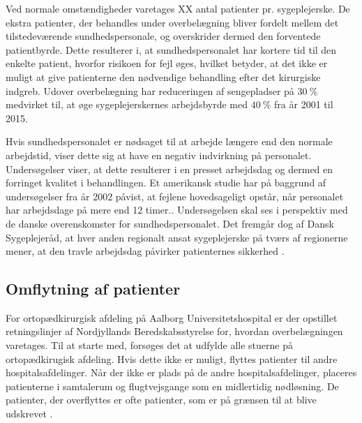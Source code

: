 \noindent 
Ved normale omstændigheder varetages XX antal patienter pr. sygeplejerske. De ekstra patienter, der behandles under overbelægning bliver fordelt mellem det tilstedeværende sundhedspersonale, og overskrider dermed den forventede patientbyrde. 
Dette resulterer i, at sundhedspersonalet har kortere tid til den enkelte patient, hvorfor risikoen for fejl øges, hvilket betyder, at det ikke er muligt at give patienterne den nødvendige behandling efter det kirurgiske indgreb. \cite{Dinges2004} \cite{Aiken2002} Udover overbelægning har reduceringen af sengepladser på $30~\%$ medvirket til, at øge sygeplejerskernes arbejdsbyrde med $40~\%$ fra år 2001 til 2015. \cite{Kjeldsen2015}


Hvis sundhedspersonalet er nødsaget til at arbejde længere end den normale arbejdstid, viser dette sig at have en negativ indvirkning på personalet.\cite{Kjeldsen2015} \cite{Dinges2004} Undersøgelser viser, at dette resulterer i en presset arbejdsdag og dermed en forringet kvalitet i behandlingen. \cite{Kjeldsen2015} Et amerikansk studie har på baggrund af undersøgelser fra år 2002 påvist, at fejlene hovedsageligt opstår, når personalet har arbejdsdage på mere end 12 timer.\cite{Dinges2004}. Undersøgelsen skal ses i perspektiv med de danske overenskomster for sundhedspersonalet. Det fremgår dog af Dansk Sygeplejeråd, at hver anden regionalt ansat sygeplejerske på tværs af regionerne mener, at den travle arbejdsdag påvirker patienternes sikkerhed \cite{Kjeldsen2015}. 
 
\subsection{Omflytning af patienter}
For ortopædkirurgisk afdeling på Aalborg Universitetshospital er der opstillet retningslinjer af Nordjyllands Beredskabsstyrelse for, hvordan overbelægningen varetages. Til at starte med, forsøges det at udfylde alle stuerne på ortopædkirugisk afdeling. Hvis dette ikke er muligt, flyttes patienter til andre hospitalsafdelinger. Når der ikke er plads på de andre hospitalsafdelinger, placeres patienterne i samtalerum og flugtvejsgange som en midlertidig nødløsning. \cite{Beredskab2016} De patienter, der overflyttes er ofte patienter, som er på grænsen til at blive udskrevet .


